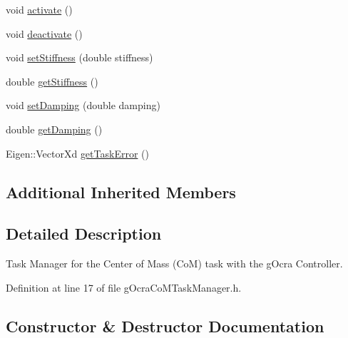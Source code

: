 \begin{DoxyCompactItemize}
\item 
void \hyperlink{classgocra_1_1gOcraCoMTaskManager_a0a2649bf8ce377a8af44e13a3571f670}{activate} ()
\item 
void \hyperlink{classgocra_1_1gOcraCoMTaskManager_aec4b5fefd71eabb7ec71d0801a5bbf5f}{deactivate} ()
\item 
void \hyperlink{classgocra_1_1gOcraCoMTaskManager_a27aec28ef1c0f7cc3e49e431c87ffe70}{set\+Stiffness} (double stiffness)
\item 
double \hyperlink{classgocra_1_1gOcraCoMTaskManager_afc838311dae748d89ef76749192b2153}{get\+Stiffness} ()
\item 
void \hyperlink{classgocra_1_1gOcraCoMTaskManager_afe1e6ca547d469d3b504fccad7a9567d}{set\+Damping} (double damping)
\item 
double \hyperlink{classgocra_1_1gOcraCoMTaskManager_a9df173026478a08d1afa64f32fab2c01}{get\+Damping} ()
\item 
Eigen\+::\+Vector\+Xd \hyperlink{classgocra_1_1gOcraCoMTaskManager_a48cd88dc2fa3db834d3d4a17d39a8c30}{get\+Task\+Error} ()
\end{DoxyCompactItemize}
\subsection*{Additional Inherited Members}


\subsection{Detailed Description}
Task Manager for the Center of Mass (CoM) task with the g\+Ocra Controller. 



Definition at line 17 of file g\+Ocra\+Co\+M\+Task\+Manager.\+h.



\subsection{Constructor \& Destructor Documentation}
\hypertarget{classgocra_1_1gOcraCoMTaskManager_a7e9edb0004e6c63e689fcc3f260bdf96}{}\label{classgocra_1_1gOcraCoMTaskManager_a7e9edb0004e6c63e689fcc3f260bdf96} 
